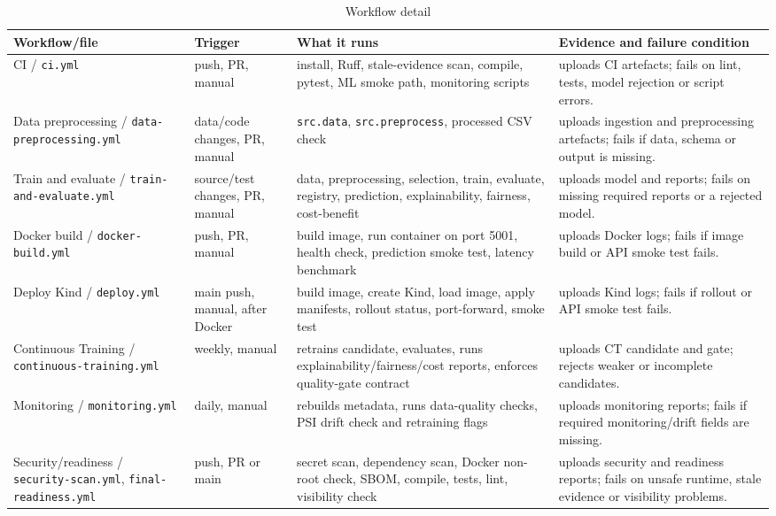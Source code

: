 \documentclass[journal,twoside,web]{ieeecolor}
\begin{document}
\begin{table}[!t]
\caption{Workflow detail}
\label{tab:workflows}
\centering
\scriptsize
\renewcommand{\arraystretch}{1.12}
\begin{tabular}{|L{1.05in}|L{0.85in}|L{2.15in}|L{2.35in}|}
\hline
\textbf{Workflow/file} & \textbf{Trigger} & \textbf{What it runs} & \textbf{Evidence and failure condition} \\
\hline
CI / \texttt{ci.yml} & push, PR, manual & install, Ruff, stale-evidence scan, compile, pytest, ML smoke path, monitoring scripts & uploads CI artefacts; fails on lint, tests, model rejection or script errors. \\
\hline
Data preprocessing / \texttt{data-preprocessing.yml} & data/code changes, PR, manual & \texttt{src.data}, \texttt{src.preprocess}, processed CSV check & uploads ingestion and preprocessing artefacts; fails if data, schema or output is missing. \\
\hline
Train and evaluate / \texttt{train-and-evaluate.yml} & source/test changes, PR, manual & data, preprocessing, selection, train, evaluate, registry, prediction, explainability, fairness, cost-benefit & uploads model and reports; fails on missing required reports or a rejected model. \\
\hline
Docker build / \texttt{docker-build.yml} & push, PR, manual & build image, run container on port 5001, health check, prediction smoke test, latency benchmark & uploads Docker logs; fails if image build or API smoke test fails. \\
\hline
Deploy Kind / \texttt{deploy.yml} & main push, manual, after Docker & build image, create Kind, load image, apply manifests, rollout status, port-forward, smoke test & uploads Kind logs; fails if rollout or API smoke test fails. \\
\hline
Continuous Training / \texttt{continuous-training.yml} & weekly, manual & retrains candidate, evaluates, runs explainability/fairness/cost reports, enforces quality-gate contract & uploads CT candidate and gate; rejects weaker or incomplete candidates. \\
\hline
Monitoring / \texttt{monitoring.yml} & daily, manual & rebuilds metadata, runs data-quality checks, PSI drift check and retraining flags & uploads monitoring reports; fails if required monitoring/drift fields are missing. \\
\hline
Security/readiness / \texttt{security-scan.yml}, \texttt{final-readiness.yml} & push, PR or main & secret scan, dependency scan, Docker non-root check, SBOM, compile, tests, lint, visibility check & uploads security and readiness reports; fails on unsafe runtime, stale evidence or visibility problems. \\
\hline
\end{tabular}
\end{table}
\end{document}
